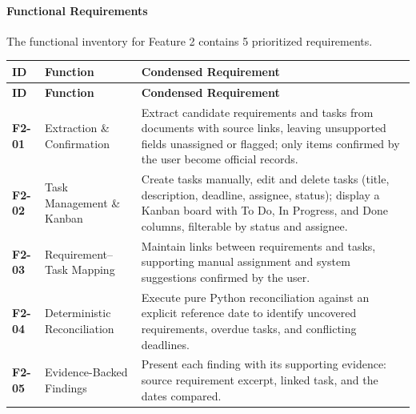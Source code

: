 \paragraph*{Functional Requirements}

The functional inventory for Feature 2 contains 5 prioritized requirements.



\begingroup

\small

\setlength{\tabcolsep}{5pt}

\renewcommand{\arraystretch}{1.15}

\begin{longtable}{>{\raggedright\arraybackslash}p{}>{\raggedright\arraybackslash}p{}>{\raggedright\arraybackslash}p{}}

\hline

\rowcolor{tablehead}

\textbf{ID} & \textbf{Function} & \textbf{Condensed Requirement} \\ \hline

\endfirsthead

\hline

\rowcolor{tablehead}

\textbf{ID} & \textbf{Function} & \textbf{Condensed Requirement} \\ \hline

\endhead

\endfoot

\endlastfoot

\textbf{F2-01} & Extraction \& Confirmation & Extract candidate requirements and tasks from documents with source links, leaving unsupported fields unassigned or flagged; only items confirmed by the user become official records. \\ \hline

\textbf{F2-02} & Task Management \& Kanban & Create tasks manually, edit and delete tasks (title, description, deadline, assignee, status); display a Kanban board with To Do, In Progress, and Done columns, filterable by status and assignee. \\ \hline

\textbf{F2-03} & Requirement--Task Mapping & Maintain links between requirements and tasks, supporting manual assignment and system suggestions confirmed by the user. \\ \hline

\textbf{F2-04} & Deterministic Reconciliation & Execute pure Python reconciliation against an explicit reference date to identify uncovered requirements, overdue tasks, and conflicting deadlines. \\ \hline

\textbf{F2-05} & Evidence-Backed Findings & Present each finding with its supporting evidence: source requirement excerpt, linked task, and the dates compared. \\ \hline

\end{longtable}

